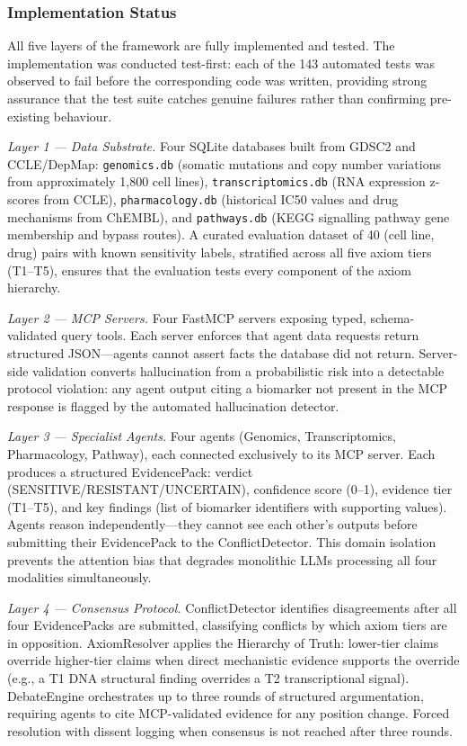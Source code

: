 \documentclass[11pt,letterpaper]{article}
\begin{document}
\subsubsection{Implementation Status}

All five layers of the framework are fully implemented and tested. The implementation was
conducted test-first: each of the 143 automated tests was observed to fail before the
corresponding code was written, providing strong assurance that the test suite catches genuine
failures rather than confirming pre-existing behaviour.

\textit{Layer 1 --- Data Substrate.} Four SQLite databases built from GDSC2 and CCLE/DepMap:
\texttt{genomics.db} (somatic mutations and copy number variations from approximately 1,800
cell lines), \texttt{transcriptomics.db} (RNA expression z-scores from CCLE), \texttt{pharmacology.db}
(historical IC50 values and drug mechanisms from ChEMBL), and \texttt{pathways.db} (KEGG
signalling pathway gene membership and bypass routes). A curated evaluation dataset of 40
(cell line, drug) pairs with known sensitivity labels, stratified across all five axiom tiers
(T1--T5), ensures that the evaluation tests every component of the axiom hierarchy.

\textit{Layer 2 --- MCP Servers.} Four FastMCP servers exposing typed, schema-validated query
tools. Each server enforces that agent data requests return structured JSON---agents cannot
assert facts the database did not return. Server-side validation converts hallucination from a
probabilistic risk into a detectable protocol violation: any agent output citing a biomarker not
present in the MCP response is flagged by the automated hallucination detector.

\textit{Layer 3 --- Specialist Agents.} Four agents (Genomics, Transcriptomics, Pharmacology,
Pathway), each connected exclusively to its MCP server. Each produces a structured
EvidencePack: verdict (SENSITIVE/RESISTANT/UNCERTAIN), confidence score (0--1), evidence
tier (T1--T5), and key findings (list of biomarker identifiers with supporting values). Agents
reason independently---they cannot see each other's outputs before submitting their EvidencePack
to the ConflictDetector. This domain isolation prevents the attention bias that degrades monolithic
LLMs processing all four modalities simultaneously.

\textit{Layer 4 --- Consensus Protocol.} ConflictDetector identifies disagreements after all four
EvidencePacks are submitted, classifying conflicts by which axiom tiers are in opposition.
AxiomResolver applies the Hierarchy of Truth: lower-tier claims override higher-tier claims when
direct mechanistic evidence supports the override (e.g., a T1 DNA structural finding overrides
a T2 transcriptional signal). DebateEngine orchestrates up to three rounds of structured
argumentation, requiring agents to cite MCP-validated evidence for any position change. Forced
resolution with dissent logging when consensus is not reached after three rounds.
\end{document}
